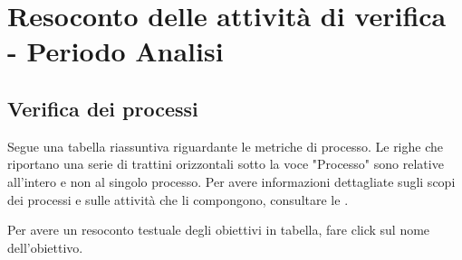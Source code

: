 \newpage

\section{Resoconto delle attività di verifica - Periodo Analisi}
	\subsection{Verifica dei processi}
		
		Segue una tabella riassuntiva riguardante le metriche di processo. Le righe che riportano una serie di trattini orizzontali sotto la voce "Processo" sono relative all'intero  e non al singolo processo.
		Per avere informazioni dettagliate sugli scopi dei processi e sulle attività che li compongono, consultare le \ndpvuno.
		
		
		Per avere un resoconto testuale degli obiettivi in tabella, fare click sul nome dell'obiettivo.
		
